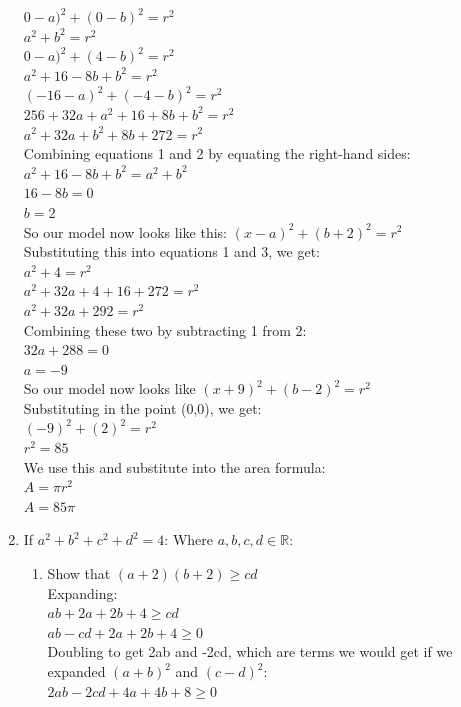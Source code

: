 \documentclass[../main.tex]{subfiles}
\begin{document}
\begin{enumerate}
    \(0-a)^2+(0-b)^2=r^2\)\\
    \(a^2+b^2=r^2\)\\

    \(0-a)^2+(4-b)^2=r^2\)\\
    \(a^2+16-8b+b^2=r^2\)\\

    \((-16-a)^2+(-4-b)^2=r^2\)\\
    \(256+32a+a^2+16+8b+b^2=r^2\)\\
    \(a^2+32a+b^2+8b+272=r^2\)\\

    Combining equations 1 and 2 by equating the right-hand sides:\\
    \(a^2+16-8b+b^2=a^2+b^2\)\\
    \(16-8b=0\)\\
    \(b=2\)\\

    So our model now looks like this: \((x-a)^2+(b+2)^2=r^2\)\\

    Substituting this into equations 1 and 3, we get:\\
    \(a^2+4=r^2\)\\
    
    \(a^2+32a+4+16+272=r^2\)\\
    \(a^2+32a+292=r^2\)\\
    
    Combining these two by subtracting 1 from 2:\\
    \(32a+288=0\)\\
    \(a=-9\)\\
    
    So our model now looks like \((x+9)^2+(b-2)^2=r^2\)\\

    Substituting in the point (0,0), we get:\\
    \((-9)^2+(2)^2=r^2\)\\
    \(r^2=85\)\\

    We use this and substitute into the area formula:\\
    \(A=\pi r^2\)\\
    \(A=85\pi\)\\
    
    \item 
    If \(a^2+b^2+c^2+d^2=4\):
    Where \(a,b,c,d \in \mathbb{R}\):
        \begin{enumerate}
            \item 
            Show that \((a+2)(b+2)\geq cd\)\\
            Expanding:\\
            \(ab+2a+2b+4\geq cd\)\\
            \(ab-cd+2a+2b+4\geq 0\)\\
            Doubling to get 2ab and -2cd, which are terms we would get if we expanded \((a+b)^2\) and \((c-d)^2\):\\
            \(2ab-2cd+4a+4b+8\geq 0\)\\


\end{enumerate}
\end{enumerate}
\end{document}

